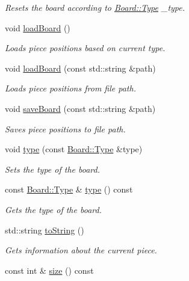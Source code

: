 \begin{DoxyCompactItemize}
\begin{DoxyCompactList}\small\item\em Resets the board according to \hyperlink{class_board_a7a90fdd0f301fc502684108416605644}{Board\-::\-Type} \-\_\-type. \end{DoxyCompactList}\item 
\hypertarget{class_board_af7b2ac390d5b62212f7b0ba98276e837}{void \hyperlink{class_board_af7b2ac390d5b62212f7b0ba98276e837}{load\-Board} ()}\label{class_board_af7b2ac390d5b62212f7b0ba98276e837}

\begin{DoxyCompactList}\small\item\em Loads piece positions based on current type. \end{DoxyCompactList}\item 
void \hyperlink{class_board_a7954dc515c68c3d8926355b1c80cc05f}{load\-Board} (const std\-::string \&path)
\begin{DoxyCompactList}\small\item\em Loads piece positions from file path. \end{DoxyCompactList}\item 
void \hyperlink{class_board_a67c2acd87290a3359c8244a4cb72b380}{save\-Board} (const std\-::string \&path)
\begin{DoxyCompactList}\small\item\em Saves piece positions to file path. \end{DoxyCompactList}\item 
void \hyperlink{class_board_a05a3dd8f1f000e20e743e894163228ec}{type} (const \hyperlink{class_board_a7a90fdd0f301fc502684108416605644}{Board\-::\-Type} \&type)
\begin{DoxyCompactList}\small\item\em Sets the type of the board. \end{DoxyCompactList}\item 
const \hyperlink{class_board_a7a90fdd0f301fc502684108416605644}{Board\-::\-Type} \& \hyperlink{class_board_ab2574abe1bfa632795d2b35ba1acb2e4}{type} () const 
\begin{DoxyCompactList}\small\item\em Gets the type of the board. \end{DoxyCompactList}\item 
std\-::string \hyperlink{class_board_a2cf2b2f6adc453bc3b086c9f10c77e11}{to\-String} ()
\begin{DoxyCompactList}\small\item\em Gets information about the current piece. \end{DoxyCompactList}\item 
\hypertarget{class_board_a84aaf6583d8b174ef864dc774979b1a2}{const int \& \hyperlink{class_board_a84aaf6583d8b174ef864dc774979b1a2}{size} () const }\label{class_board_a84aaf6583d8b174ef864dc774979b1a2}


\end{DoxyCompactItemize}
